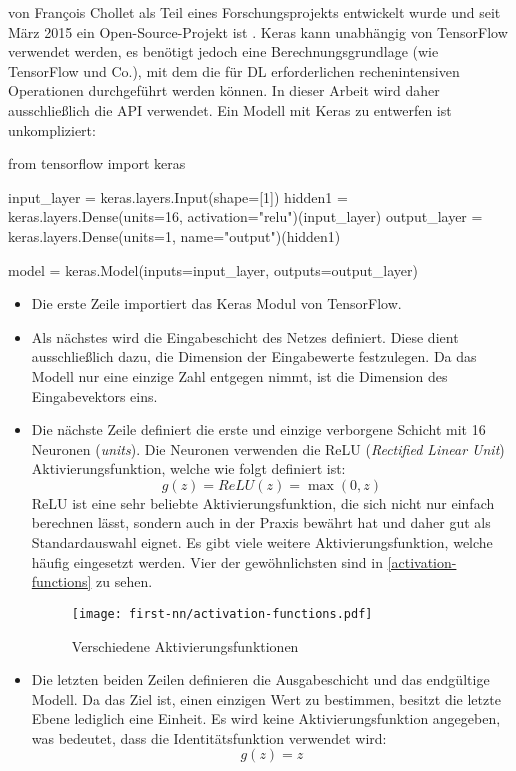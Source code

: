 von François Chollet als Teil eines Forschungsprojekts entwickelt
wurde und seit März 2015 ein Open-Source-Projekt ist
\parencite[295]{book:hands-on-ml}. Keras kann
unabhängig von TensorFlow verwendet werden, es benötigt
jedoch eine Berechnungsgrundlage (wie TensorFlow und Co.),
mit dem die für DL erforderlichen rechenintensiven Operationen durchgeführt werden können.
In dieser Arbeit wird daher ausschließlich die  API
verwendet. Ein Modell mit Keras zu entwerfen ist unkompliziert:
\begin{pythoncode}
from tensorflow import keras

input_layer = keras.layers.Input(shape=[1])
hidden1 = keras.layers.Dense(units=16, activation="relu")(input_layer)
output_layer = keras.layers.Dense(units=1, name="output")(hidden1)

model = keras.Model(inputs=input_layer, outputs=output_layer)
\end{pythoncode}
\begin{itemize}
  \item Die erste Zeile importiert das Keras Modul von TensorFlow.
  \item Als nächstes wird die Eingabeschicht des Netzes definiert.
        Diese dient ausschließlich dazu, die Dimension der Eingabewerte festzulegen.
        Da das Modell nur eine einzige Zahl entgegen nimmt,
        ist die Dimension des Eingabevektors eins.
  \item Die nächste Zeile definiert die erste und einzige verborgene Schicht mit
        16 Neuronen (\textit{units}). Die Neuronen verwenden die ReLU
        (\textit{Rectified Linear Unit}) Aktivierungsfunktion, welche wie folgt
        definiert ist:
        \begin{equation}
          g(z) = ReLU(z) = \max(0, z)
        \end{equation}
        ReLU ist eine sehr beliebte Aktivierungsfunktion, die sich nicht
        nur einfach berechnen lässt, sondern auch in der Praxis bewährt hat
        und daher gut als Standardauswahl eignet. Es gibt viele
        weitere Aktivierungsfunktion, welche häufig eingesetzt werden.
        Vier der gewöhnlichsten sind in \autoref{activation-functions}
        zu sehen.
        \newpage
        \begin{figure}[h!]
          \centering
          \texttt{[image: first-nn/activation-functions.pdf]}
          \caption{Verschiedene Aktivierungsfunktionen \parencite[292]{book:hands-on-ml}}
          \label{activation-functions}
        \end{figure}
  \item Die letzten beiden Zeilen definieren die Ausgabeschicht und das endgültige
        Modell. Da das Ziel ist, einen einzigen Wert zu bestimmen, besitzt die letzte
        Ebene lediglich eine Einheit. Es wird keine Aktivierungsfunktion angegeben,
        was bedeutet, dass die Identitätsfunktion verwendet wird:
        \begin{equation}
          g(z) = z
        \end{equation}
\end{itemize}
